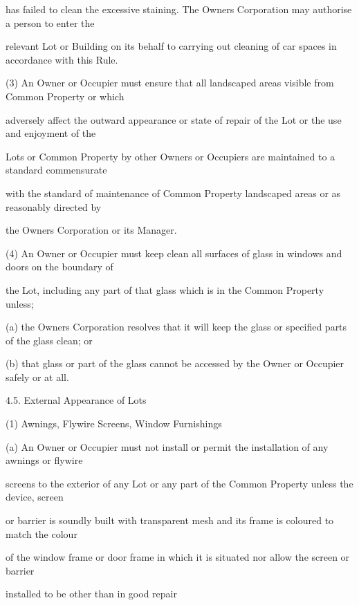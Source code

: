 \documentclass{article}
\begin{document}
{\fontsize{10.02}{1}has failed to clean the excessive staining. The Owners Corporation may authorise a person to enter the }

{\fontsize{10.02}{1}relevant Lot or Building on its behalf to carrying out cleaning of car spaces in accordance with this Rule. }

{\fontsize{9.962}{1}(3) An Owner or Occupier must ensure that all landscaped areas visible from Common Property or which }

{\fontsize{10.02}{1}adversely affect the outward appearance or state of repair of the Lot or the use and enjoyment of the }

{\fontsize{10.02}{1}Lots or Common Property by other Owners or Occupiers are maintained to a standard commensurate }

{\fontsize{10.02}{1}with the standard of maintenance of Common Property landscaped areas or as reasonably directed by }

{\fontsize{10.02}{1}the Owners Corporation or its Manager. }

{\fontsize{9.962}{1}(4) An Owner or Occupier must keep clean all surfaces of glass in windows and doors on the boundary of }

{\fontsize{10.02}{1}the Lot, including any part of that glass which is in the Common Property unless; }

{\fontsize{9.962}{1}(a) the Owners Corporation resolves that it will keep the glass or specified parts of the glass clean; or }

{\fontsize{9.962}{1}(b) that glass or part of the glass cannot be accessed by the Owner or Occupier safely or at all. }

{\fontsize{9.99}{1}4.5. External Appearance of Lots }

{\fontsize{9.962}{1}(1) Awnings, Flywire Screens, Window Furnishings }

{\fontsize{9.962}{1}(a) An Owner or Occupier must not install or permit the installation of any awnings or flywire }

{\fontsize{10.02}{1}screens to the exterior of any Lot or any part of the Common Property unless the device, screen }

{\fontsize{10.02}{1}or barrier is soundly built with transparent mesh and its frame is coloured to match the colour }

{\fontsize{10.02}{1}of the window frame or door frame in which it is situated nor allow the screen or barrier }

{\fontsize{10.02}{1}installed to be other than in good repair }
\end{document}
